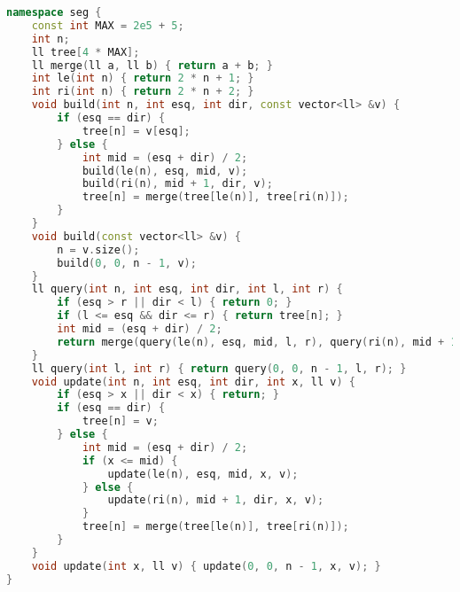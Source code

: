\documentclass[11pt, a4paper, twoside]{book}
\begin{document}
\hfill

\begin{lstlisting}[language=C++]
namespace seg {
    const int MAX = 2e5 + 5;
    int n;
    ll tree[4 * MAX];
    ll merge(ll a, ll b) { return a + b; }
    int le(int n) { return 2 * n + 1; }
    int ri(int n) { return 2 * n + 2; }
    void build(int n, int esq, int dir, const vector<ll> &v) {
        if (esq == dir) {
            tree[n] = v[esq];
        } else {
            int mid = (esq + dir) / 2;
            build(le(n), esq, mid, v);
            build(ri(n), mid + 1, dir, v);
            tree[n] = merge(tree[le(n)], tree[ri(n)]);
        }
    }
    void build(const vector<ll> &v) {
        n = v.size();
        build(0, 0, n - 1, v);
    }
    ll query(int n, int esq, int dir, int l, int r) {
        if (esq > r || dir < l) { return 0; }
        if (l <= esq && dir <= r) { return tree[n]; }
        int mid = (esq + dir) / 2;
        return merge(query(le(n), esq, mid, l, r), query(ri(n), mid + 1, dir, l, r));
    }
    ll query(int l, int r) { return query(0, 0, n - 1, l, r); }
    void update(int n, int esq, int dir, int x, ll v) {
        if (esq > x || dir < x) { return; }
        if (esq == dir) {
            tree[n] = v;
        } else {
            int mid = (esq + dir) / 2;
            if (x <= mid) {
                update(le(n), esq, mid, x, v);
            } else {
                update(ri(n), mid + 1, dir, x, v);
            }
            tree[n] = merge(tree[le(n)], tree[ri(n)]);
        }
    }
    void update(int x, ll v) { update(0, 0, n - 1, x, v); }
}
\end{lstlisting}

\hfill
\end{document}
